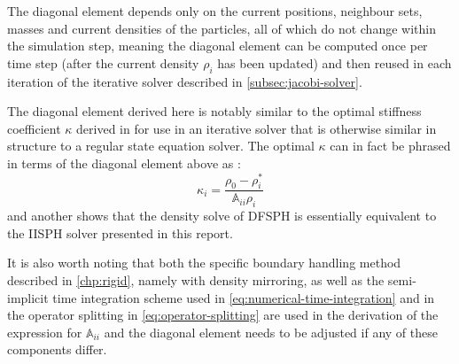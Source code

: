 \documentclass[oneside, a4paper]{book}
\newcommand\vek[1]{\vec{\bm{#1}}}
\newcommand\br[1]{\left(#1\right)}
\begin{document}
    
    The diagonal element depends only on the current positions, neighbour sets, masses and current densities of the particles, all of which do not change within the simulation step, meaning the diagonal element can be computed once per time step (after the current density $\rho_i$ has been updated) and then reused in each iteration of the iterative solver described in \autoref{subsec:jacobi-solver}. 

    The diagonal element derived here is notably similar to the optimal stiffness coefficient $\kappa$ derived in \autocite[Divergence-Free SPH]{dfsph} for use in an iterative solver that is otherwise similar in structure to a regular state equation solver. The optimal $\kappa$ can in fact be phrased in terms of the diagonal element above as \autocite{dfsph}:
    \begin{equation}\label{eq:dfsph-kappa-di}
      \kappa_i = \frac{\rho_0 - \rho_i^*}{\mathds{A}_{ii}\rho_i}
    \end{equation}
    and another \autocite[survey paper]{2022-survey-equographics-star} shows that the density solve of DFSPH is essentially equivalent to the IISPH solver presented in this report.
    
    It is also worth noting that both the specific boundary handling method described in \autoref{chp:rigid}, namely \autocite[consistent boundaries]{consistent-boundaries} with density mirroring, as well as the semi-implicit time integration scheme used in \autoref{eq:numerical-time-integration} and in the operator splitting in \autoref{eq:operator-splitting} are used in the derivation of the expression for $\mathds{A}_{ii}$ and the diagonal element needs to be adjusted if any of these components differ.
\end{document}
